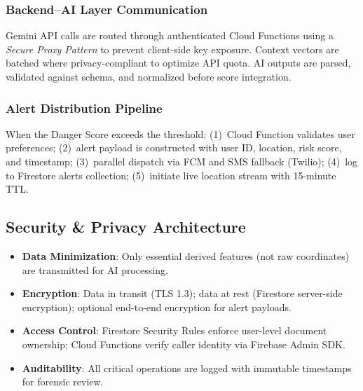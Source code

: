 \subsubsection{Backend--AI Layer Communication}
Gemini API calls are routed through authenticated Cloud Functions using a \textit{Secure Proxy Pattern} to prevent client-side key exposure. Context vectors are batched where privacy-compliant to optimize API quota. AI outputs are parsed, validated against schema, and normalized before score integration.

\subsubsection{Alert Distribution Pipeline}
When the Danger Score exceeds the threshold: (1)~Cloud Function validates user preferences; (2)~alert payload is constructed with user ID, location, risk score, and timestamp; (3)~parallel dispatch via FCM and SMS fallback (Twilio); (4)~log to Firestore alerts collection; (5)~initiate live location stream with 15-minute TTL.

\subsection{Security \& Privacy Architecture}
\begin{itemize}[leftmargin=*]
  \item \textbf{Data Minimization}: Only essential derived features (not raw coordinates) are transmitted for AI processing.
  \item \textbf{Encryption}: Data in transit (TLS 1.3); data at rest (Firestore server-side encryption); optional end-to-end encryption for alert payloads.
  \item \textbf{Access Control}: Firestore Security Rules enforce user-level document ownership; Cloud Functions verify caller identity via Firebase Admin SDK.
  \item \textbf{Auditability}: All critical operations are logged with immutable timestamps for forensic review.
\end{itemize}
